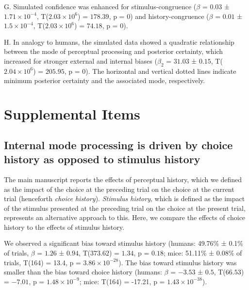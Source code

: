 \documentclass[
]{article}
\begin{document}
G. Simulated confidence was enhanced for stimulus-congruence (\(\beta\)
= \(0.03\) ± \(\ensuremath{1.71\times 10^{-4}}\),
T(\(\ensuremath{2.03\times 10^{6}}\)) = \(178.39\), p = \(0\)) and
history-congruence (\(\beta\) = \(0.01\) ±
\(\ensuremath{1.5\times 10^{-4}}\),
T(\(\ensuremath{2.03\times 10^{6}}\)) = \(74.18\), p = \(0\)).

H. In analogy to humans, the simulated data showed a quadratic
relationship between the mode of perceptual processing and posterior
certainty, which increased for stronger external and internal biases
(\(\beta_2\) = \(31.03\) ± \(0.15\),
T(\(\ensuremath{2.04\times 10^{6}}\)) = \(205.95\), p = \(0\)). The
horizontal and vertical dotted lines indicate minimum posterior
certainty and the associated mode, respectively.

\newpage

\hypertarget{supplemental-items}{%
\section{Supplemental Items}\label{supplemental-items}}

\hypertarget{internal-mode-processing-is-driven-by-choice-history-as-opposed-to-stimulus-history}{%
\subsection{Internal mode processing is driven by choice history as
opposed to stimulus
history}\label{internal-mode-processing-is-driven-by-choice-history-as-opposed-to-stimulus-history}}

The main manuscript reports the effects of perceptual history, which we
defined as the impact of the choice at the preceding trial on the choice
at the current trial (henceforth \emph{choice history}). \emph{Stimulus
history}, which is defined as the impact of the stimulus presented at
the preceding trial on the choice at the present trial, represents an
alternative approach to this. Here, we compare the effects of choice
history to the effects of stimulus history.

We observed a significant bias toward stimulus history (humans: 49.76\%
± 0.1\% of trials, \(\beta\) = \(1.26\) ± \(0.94\), T(\(373.62\)) =
\(1.34\), p = \(0.18\); mice: 51.11\% ± 0.08\% of trials, T(164) = 13.4,
p = \(\ensuremath{3.86\times 10^{-28}}\)). The bias toward stimulus
history was smaller than the bias toward choice history (humans:
\(\beta\) = \(-3.53\) ± \(0.5\), T(\(66.53\)) = \(-7.01\), p =
\(\ensuremath{1.48\times 10^{-9}}\); mice: T(164) = -17.21, p =
\(\ensuremath{1.43\times 10^{-38}}\)).
\end{document}
